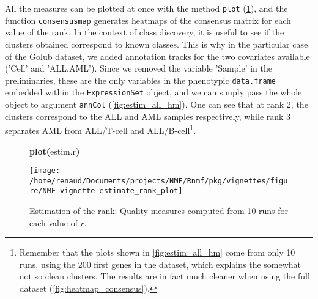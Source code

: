 \documentclass[a4paper]{article}\usepackage{graphicx, color}
\makeatletter
\def\maxwidth{ %
  \ifdim\Gin@nat@width>\linewidth
    \linewidth
  \else
    \Gin@nat@width
  \fi
}
\newcommand{\hlfunctioncall}[1]{\textcolor[rgb]{0.501960784313725,0,0.329411764705882}{\textbf{#1}}}%
\newcommand{\hlkeyword}[1]{\textcolor[rgb]{0,0,0}{\textbf{#1}}}%
\newcommand{\hlsymbol}[1]{\textcolor[rgb]{0,0,0}{#1}}%
\newenvironment{kframe}{%
 \def\FrameCommand##1{\hskip\@totalleftmargin \hskip-\fboxsep
 \colorbox{shadecolor}{##1}\hskip-\fboxsep
     \hskip-\linewidth \hskip-\@totalleftmargin \hskip\columnwidth}%
 \MakeFramed {\advance\hsize-\width
   \@totalleftmargin\z@ \linewidth\hsize
   \@setminipage}}%
 {\par\unskip\endMakeFramed}
\newenvironment{knitrout}{}{} %
\let\code=\texttt
\makeatother
\begin{document}
All the measures can be plotted at once with the method \code{plot} (\cref{fig:estim_all}), and the function \code{consensusmap} generates heatmaps of the consensus matrix for each value of the rank.
In the context of class discovery, it is useful to see if the clusters obtained correspond to known classes.
This is why in the particular case of the Golub dataset, we added annotation tracks for the two covariates available ('Cell' and 'ALL.AML').
Since we removed the variable 'Sample' in the preliminaries, these are the only variables in the phenotypic \code{data.frame} embedded within the \code{ExpressionSet} object, and we can simply pass the whole object to argument \code{annCol} (\cref{fig:estim_all_hm}).
One can see that at rank 2, the clusters correspond to the ALL and AML samples respectively, while rank 3 separates AML from ALL/T-cell and ALL/B-cell\footnote{Remember that the plots shown in \cref{fig:estim_all_hm} come from only 10 runs, using the 200 first genes in the dataset, which explains the somewhat not so clean clusters.
The results are in fact much cleaner when using the full dataset (\cref{fig:heatmap_consensus}).}.

\begin{figure}\label{fig:estim_all}
\begin{knitrout}
\color{fgcolor}\begin{kframe}
\begin{flushleft}
\ttfamily\noindent
\hlfunctioncall{plot}\hlkeyword{(}\hlsymbol{estim.r}\hlkeyword{)}\mbox{}
\normalfont
\end{flushleft}
\end{kframe}\texttt{[image: /home/renaud/Documents/projects/NMF/Rnmf/pkg/vignettes/figure/NMF-vignette-estimate\_rank\_plot]} 
\end{knitrout}

\caption{Estimation of the rank: Quality measures computed from 10 runs for each value of $r$.}
\end{figure}
\end{document}
